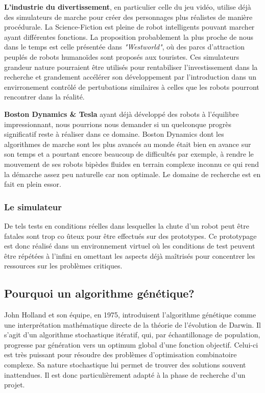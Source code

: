 \documentclass[journal, a4paper]{IEEEtran}
\begin{document}
	\textbf{L'industrie du divertissement}, en particulier celle du
	jeu vidéo,
	utilise déjà des simulateurs de marche pour créer des personnages
	plus réalistes de manière procédurale.
	La Science-Fiction est pleine de robot intelligents pouvant
	marcher ayant différentes fonctions.
	La proposition probablement la plus proche de nous dans le
	temps est celle présentée dans \textit{"Westworld"}, où des parcs
	d'attraction peuplés de robots humanoïdes sont proposés aux
	touristes. Ces simulateurs grandeur nature pourraient être
	utilisés pour rentabiliser l'investissement dans la recherche
	et grandement accélérer son développement par l'introduction dans
	un envirronement contrôlé de
	pertubations similaires à celles que les robots pourront rencontrer
	dans
	la réalité.

	\textbf{Boston Dynamics \& Tesla} ayant déjà développé des robots
	à l'équilibre impressionnant, nous pourrions nous demander si un
	quelconque progrès significatif reste à réaliser dans ce domaine.
	Boston Dynamics dont les algorithmes de marche sont les plus
	avancés au monde était bien en avance sur son temps et a pourtant
	encore beaucoup de difficultés par exemple, à rendre le mouvement
	de
	ses robots
	bipèdes fluides en terrain complexe inconnu ce qui rend la démarche
	assez peu naturelle car non optimale. Le
	domaine de recherche est en fait en plein essor.

	\subsubsection{Le simulateur}
	De tels tests en conditions réelles dans lesquelles la chute
	d'un robot peut être fatales sont trop co
	ûteux
	pour être effectués sur des prototypes.
	Ce prototypage est donc réalisé dans un environnement virtuel où les
	conditions de test peuvent être répétées à l'infini en omettant les
	aspects déjà maîtrisés pour concentrer les ressources sur les
	problèmes critiques.


	\subsection{Pourquoi un algorithme génétique?}\label{subsec:pourquoi-un-algorithme-genetique?}
	John Holland et son équipe, en 1975, introduisent
	l'algorithme génétique\cite{systems-adaptation} comme une
	interprétation mathématique directe de la théorie de l'évolution de
	Darwin.
	Il s'agit d'un algorithme stochastique itératif, qui, par
	échantillonage de population, progresse par génération
	vers	un optimum global d’une fonction objectif.
	Celui-ci est très puissant pour résoudre des problèmes
	d'optimisation combinatoire complexe.
	Sa nature stochastique lui permet de trouver des solutions souvent
	inattendues. Il est donc particulièrement adapté à la phase de
	recherche d'un projet.
\end{document}
